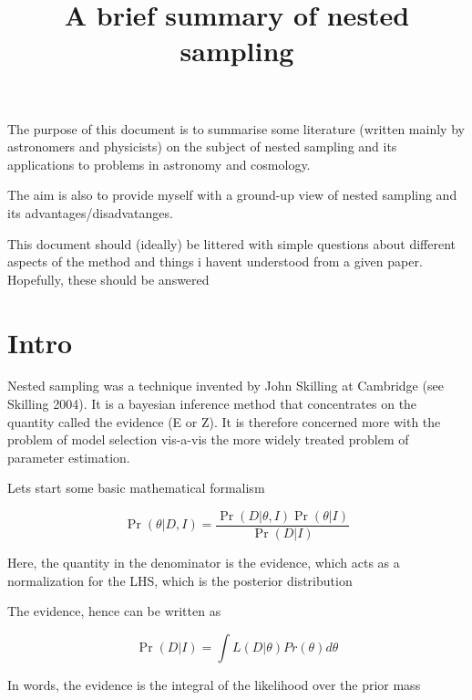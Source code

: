 \documentclass{article}
\begin{document}
\title{A brief summary of nested sampling}
\maketitle
The purpose of this document is to summarise some literature (written mainly by astronomers and physicists) on the subject of nested sampling and its applications to problems in astronomy and cosmology.

The aim is also to provide myself with a ground-up view of nested sampling and its advantages/disadvatanges.

This document should (ideally) be littered with simple questions about different aspects of the method and things i havent understood from a given paper. 
Hopefully, these should be answered
\section{Intro}
Nested sampling was a technique invented by John Skilling at Cambridge (see Skilling 2004). It is a bayesian inference method that concentrates on the quantity called the evidence (E or Z). It is therefore concerned more with the problem of model selection vis-a-vis the more widely treated problem of parameter estimation. 

Lets start some basic mathematical formalism

\begin{equation}
\Pr(\theta | D, I) = \frac{\Pr(D | \theta, I) \Pr(\theta |  I)}{\Pr(D | I )}
\end{equation}

Here, the quantity in the denominator is the evidence, which acts as a normalization for the LHS, which is the posterior distribution

The evidence, hence can be written as

\begin{equation}
\Pr(D | I)= \int L(D | \theta) Pr(\theta) d \theta
\end{equation}

In words, the evidence is the integral of the likelihood over the prior mass 
\end{document}
